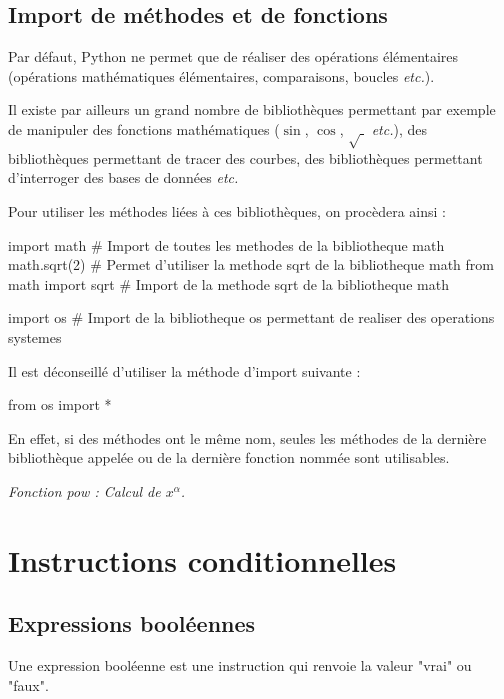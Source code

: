 \documentclass[10pt,fleqn]{article} %
\begin{document}
\subsection{Import de méthodes et de fonctions}

Par défaut, Python ne permet que de réaliser des opérations élémentaires (opérations mathématiques élémentaires, comparaisons, boucles \textit{etc.}). 

Il existe par ailleurs un grand nombre de bibliothèques permettant par exemple de manipuler des fonctions mathématiques ($\sin$, $\cos$, $\sqrt{\;}$ \textit{etc.}), des bibliothèques permettant de tracer des courbes, des bibliothèques permettant d'interroger des bases de données \textit{etc.}

 

Pour utiliser les méthodes liées à ces bibliothèques, on procèdera ainsi :

\begin{py}
\begin{python}
import math  # Import de toutes les methodes de la bibliotheque math
math.sqrt(2) # Permet d'utiliser la methode sqrt de la bibliotheque math
from math import sqrt # Import de la methode sqrt de la bibliotheque math

import os # Import de la bibliotheque os permettant de realiser des operations systemes
\end{python}
\end{py} 

\begin{warn}
Il est déconseillé d'utiliser la méthode d'import suivante : 
\begin{python}
from os import *
\end{python}

En effet, si des méthodes ont le même nom, seules les méthodes de la dernière bibliothèque appelée ou de la dernière fonction nommée sont utilisables. 
\end{warn}


\begin{exemple}
\textit{Fonction pow : Calcul de $x^\alpha$.}

\end{exemple}
\section{Instructions conditionnelles}



\subsection{Expressions booléennes}
\begin{defi}
Une expression booléenne est une instruction qui renvoie la valeur "vrai" ou "faux".
\end{defi}
\end{document}
